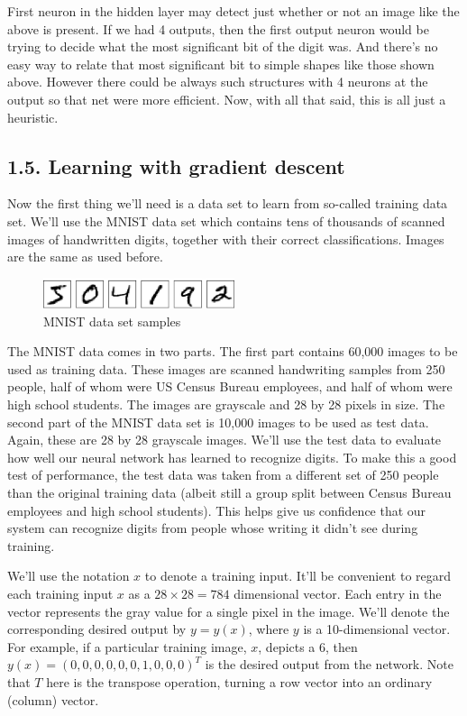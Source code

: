 \documentclass[12 pt]{article}
\begin{document}
First neuron in the hidden layer may detect just whether or not an image
like the above is present. If we had 4 outputs, then the first output
neuron would be trying to decide what the most significant bit of the
digit was. And there's no easy way to relate that most significant bit
to simple shapes like those shown above. However there could be always
such structures with 4 neurons at the output so that net were more
efficient. Now, with all that said, this is all just a heuristic.

\subsection{1.5. Learning with gradient descent}
\label{learning-with-gradient-descent}

Now the first thing we'll need is a data set to learn from so-called
training data set. We'll use the MNIST data set which contains
tens of thousands of scanned images of handwritten digits, together with
their correct classifications. Images are the same as used before.

\begin{figure}[htp]
\centering
\includegraphics[width=0.5\textwidth]{./figs/digits_separate.png}
\caption{MNIST data set samples}
\end{figure}

The MNIST data comes in two parts. The first part contains 60,000 images
to be used as training data. These images are scanned handwriting
samples from 250 people, half of whom were US Census Bureau employees,
and half of whom were high school students. The images are grayscale and
28 by 28 pixels in size. The second part of the MNIST data set is 10,000
images to be used as test data. Again, these are 28 by 28 grayscale
images. We'll use the test data to evaluate how well our neural network
has learned to recognize digits. To make this a good test of
performance, the test data was taken from a different set of 250 people
than the original training data (albeit still a group split between
Census Bureau employees and high school students). This helps give us
confidence that our system can recognize digits from people whose
writing it didn't see during training.

We'll use the notation $ x $ to denote a training input. It'll be
convenient to regard each training input $ x $ as a $ 28 \times 28 =
784 $ dimensional vector. Each entry in the vector represents the gray
value for a single pixel in the image. We'll denote the corresponding
desired output by $ y = y(x) $, where $ y $ is a 10-dimensional
vector. For example, if a particular training image, $ x $,
depicts a 6, then $ y(x)=(0,0,0,0,0,0,1,0,0,0) ^ T $ is the
desired output from the network. Note that $ T $ here is the transpose
operation, turning a row vector into an ordinary (column) vector.
\end{document}
